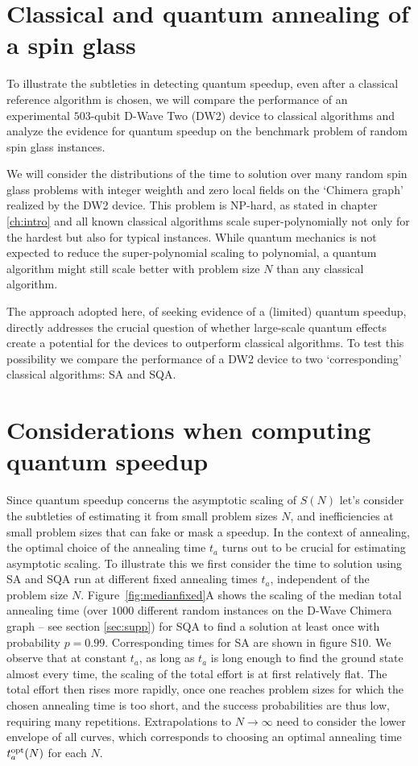 \section{Classical and quantum annealing of a spin glass}

To illustrate the subtleties in detecting quantum speedup, even after a classical reference algorithm is chosen, we will compare the performance of an experimental $503$-qubit D-Wave Two (DW2) device to classical algorithms and analyze the evidence for quantum speedup on the benchmark problem of random spin glass instances.

We will consider the distributions of the time to solution over many random spin glass problems with integer weighth and zero local fields on the `Chimera graph' realized by the DW2 device. This problem is NP-hard\cite{Barahona1982}, as stated in chapter \ref{ch:intro} and all known classical algorithms scale super-polynomially not only for the hardest but also for typical instances. While quantum mechanics is not expected to reduce the super-polynomial scaling to polynomial, a quantum algorithm might still scale better with problem size $N$ than any classical algorithm.

The approach adopted here, of seeking evidence of a (limited) quantum speedup, directly addresses the crucial question of whether large-scale quantum effects create a potential for the devices to outperform classical algorithms. To test this possibility we compare the performance of a DW2 device to two `corresponding' classical algorithms: SA and SQA.

\section{Considerations when computing quantum speedup}

Since quantum speedup concerns the asymptotic scaling of $S(N)$ let's consider the subtleties of estimating it from small problem sizes $N$, and inefficiencies at small problem sizes that can fake or mask a speedup. In the context of annealing, the optimal choice of the annealing time $t_a$ turns out to be crucial for estimating asymptotic scaling. To illustrate this we first consider the time to solution using SA and SQA run at different {fixed} annealing times $t_a$, independent of the problem size $N$. Figure~\ref{fig:medianfixed}A shows the scaling of the median total annealing time (over $1000$ different random instances on the D-Wave Chimera graph -- see section \ref{sec:supp}) for SQA to find a solution at least once with probability $p=0.99$. Corresponding times for SA are shown in figure S10. We observe that at constant $t_a$, as long as $t_a$ is long enough to find the ground state almost every time, the scaling of the total effort is at first relatively flat. The total effort then rises more rapidly, once one reaches problem sizes for which the chosen annealing time is too short, and the success probabilities are thus low, requiring many repetitions. Extrapolations to $N\rightarrow\infty$ need to consider the lower envelope of all curves, which corresponds to choosing an optimal annealing time $t_a^{\rm opt}(N)$ for each $N$.

